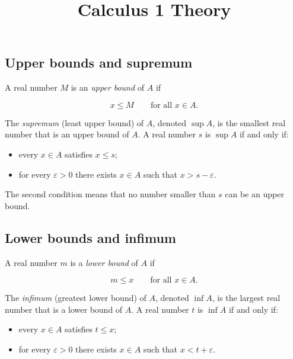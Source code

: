 \documentclass[11pt,a4paper]{article} \usepackage[T1]{fontenc}
\theoremstyle{plain} \newtheorem{theorem}{Theorem} \title{Calculus 1 Theory}
\begin{document}
\subsection*{Upper bounds and supremum}

\begin{definition}
 A real number $M$ is an \emph{upper bound} of $A$ if

\[
x \le M \qquad \text{for all } x\in A.
\]

\end{definition}

\begin{definition}
[Supremum] The \emph{supremum} (least upper bound) of $A$, denoted $\sup A$, is
the smallest real number that is an upper bound of $A$. A real number $s$ is
$\sup A$ if and only if:

\begin{itemize}
\item every $x\in A$ satisfies $x\le s$;
\item for every $\varepsilon>0$ there exists $x\in A$ such that $x >
s-\varepsilon$.
\end{itemize}

\end{definition}

The second condition means that no number smaller than $s$ can be an upper
bound.

\subsection*{Lower bounds and infimum}

\begin{definition}
 A real number $m$ is a \emph{lower bound} of $A$ if

\[
m \le x \qquad \text{for all } x\in A.
\]

\end{definition}

\begin{definition}
[Infimum] The \emph{infimum} (greatest lower bound) of $A$, denoted $\inf A$,
is the largest real number that is a lower bound of $A$. A real number $t$ is
$\inf A$ if and only if:

\begin{itemize}
\item every $x\in A$ satisfies $t\le x$;
\item for every $\varepsilon>0$ there exists $x\in A$ such that $x <
t+\varepsilon$.
\end{itemize}

\end{definition}
\end{document}
